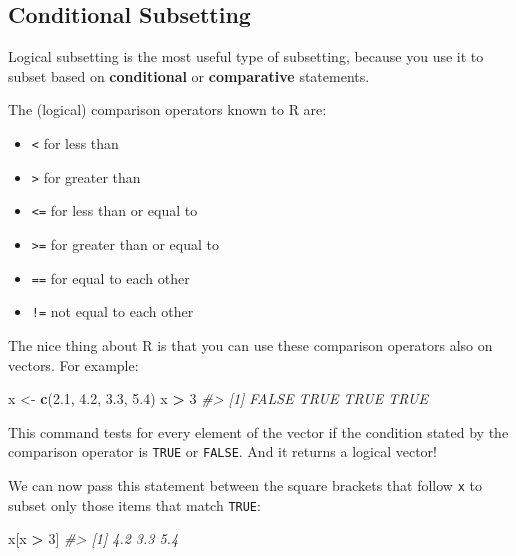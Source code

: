 \documentclass[]{book}
\newenvironment{Shaded}{\begin{snugshade}}{\end{snugshade}}
\newcommand{\CommentTok}[1]{\textcolor[rgb]{0.56,0.35,0.01}{\textit{#1}}}
\newcommand{\DecValTok}[1]{\textcolor[rgb]{0.00,0.00,0.81}{#1}}
\newcommand{\FloatTok}[1]{\textcolor[rgb]{0.00,0.00,0.81}{#1}}
\newcommand{\KeywordTok}[1]{\textcolor[rgb]{0.13,0.29,0.53}{\textbf{#1}}}
\newcommand{\NormalTok}[1]{#1}
\newcommand{\OperatorTok}[1]{\textcolor[rgb]{0.81,0.36,0.00}{\textbf{#1}}}
\newcommand{\StringTok}[1]{\textcolor[rgb]{0.31,0.60,0.02}{#1}}
\providecommand{\tightlist}{%
  \setlength{\itemsep}{0pt}\setlength{\parskip}{0pt}}
\begin{document}
\hypertarget{conditional-subsetting}{%
\subsection{Conditional Subsetting}\label{conditional-subsetting}}

Logical subsetting is the most useful type of subsetting, because you use it to subset based on \textbf{conditional} or \textbf{comparative} statements.

The (logical) comparison operators known to R are:

\begin{itemize}
\tightlist
\item
  \texttt{\textless{}} for less than
\item
  \texttt{\textgreater{}} for greater than
\item
  \texttt{\textless{}=} for less than or equal to
\item
  \texttt{\textgreater{}=} for greater than or equal to
\item
  \texttt{==} for equal to each other
\item
  \texttt{!=} not equal to each other
\end{itemize}

The nice thing about R is that you can use these comparison operators also on vectors. For example:

\begin{Shaded}
\begin{Highlighting}[]
\NormalTok{x <-}\StringTok{ }\KeywordTok{c}\NormalTok{(}\FloatTok{2.1}\NormalTok{, }\FloatTok{4.2}\NormalTok{, }\FloatTok{3.3}\NormalTok{, }\FloatTok{5.4}\NormalTok{)}
\NormalTok{x }\OperatorTok{>}\StringTok{ }\DecValTok{3}
\CommentTok{#> [1] FALSE  TRUE  TRUE  TRUE}
\end{Highlighting}
\end{Shaded}

This command tests for every element of the vector if the condition stated by the comparison operator is \texttt{TRUE} or \texttt{FALSE}. And it returns a logical vector!

We can now pass this statement between the square brackets that follow \texttt{x} to subset only those items that match \texttt{TRUE}:

\begin{Shaded}
\begin{Highlighting}[]
\NormalTok{x[x }\OperatorTok{>}\StringTok{ }\DecValTok{3}\NormalTok{]}
\CommentTok{#> [1] 4.2 3.3 5.4}
\end{Highlighting}
\end{Shaded}
\end{document}
